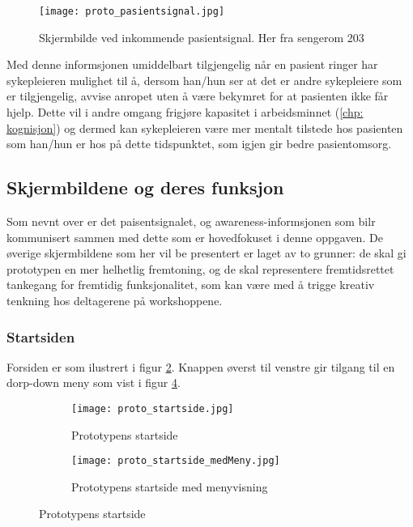 \begin{figure}[H]
\centering
\texttt{[image: proto\_pasientsignal.jpg]}
\caption{Skjermbilde ved inkommende pasientsignal. Her fra sengerom 203}
\label{protoPasientsignal}
\end{figure}

Med denne informsjonen umiddelbart tilgjengelig når en pasient ringer har sykepleieren mulighet til å, dersom han/hun ser at det er andre sykepleiere som er tilgjengelig, avvise anropet uten å være bekymret for at pasienten ikke får hjelp. Dette vil i andre omgang frigjøre kapasitet i arbeidsminnet (\ref{chp: kognisjon}) og dermed kan sykepleieren være mer mentalt tilstede hos pasienten som han/hun er hos på dette tidspunktet, som igjen gir bedre pasientomsorg.

\subsection{Skjermbildene og deres funksjon}

Som nevnt over er det paisentsignalet, og awareness-informsjonen som bilr kommunisert sammen med dette som er hovedfokuset i denne oppgaven. De øverige skjermbildene som her vil be presentert er laget av to grunner: de skal gi prototypen en mer helhetlig fremtoning, og de skal representere fremtidsrettet tankegang for fremtidig funksjonalitet, som kan være med å trigge kreativ tenkning hos deltagerene på workshoppene.

\subsubsection{Startsiden}
Forsiden er som ilustrert i figur \ref{proto_startside}. Knappen øverst til venstre gir tilgang til en dorp-down meny som vist i figur \ref{proto_startside_medMeny}. 

\begin{figure}[H]
	\centering
	\begin{subfigure}[b]{0.48\textwidth}
		\texttt{[image: proto\_startside.jpg]}
		\caption{Prototypens startside}
		\label{proto_startside}
	\end{subfigure}
	\begin{subfigure}[b]{0.48\textwidth}
		\texttt{[image: proto\_startside\_medMeny.jpg]}
		\caption{Prototypens startside med menyvisning}
		\label{proto_startside_medMeny}
	\end{subfigure}
	\caption{Prototypens startside}
\end{figure}

